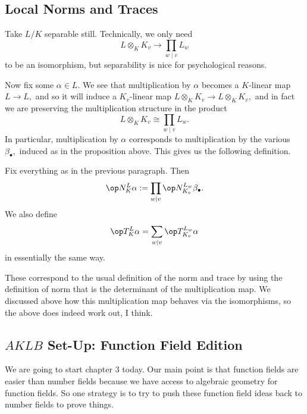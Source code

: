 \documentclass[../notes.tex]{subfiles}
\begin{document}
\subsection{Local Norms and Traces}
Take $L/K$ separable still. Technically, we only need
\[L\otimes_KK_v\to\prod_{w\mid v}L_w\]
to be an isomorphism, but separability is nice for psychological reasons.

Now fix some $\alpha\in L.$ We see that multiplication by $\alpha$ becomes a $K$-linear map $L\to L,$ and so it will induce a $K_v$-linear map $L\otimes_KK_v\to L\otimes_KK_v,$ and in fact we are preserving the multiplication structure in the product
\[L\otimes_KK_v\cong\prod_{w\mid v}L_w.\]
In particular, multiplication by $\alpha$ corresponds to multiplication by the various $\beta_\bullet,$ induced as in the proposition above. This gives us the following definition.
\begin{definition}
	Fix everything as in the previous paragraph. Then
	\[\op N_K^L\alpha:=\prod_{w\mid v}\op N_{K_v}^{L_w}\beta_\bullet.\]
	We also define
	\[\op T_K^L\alpha=\sum_{w\mid v}\op T_{K_v}^{L_w}\alpha\]
	in essentially the same way.
\end{definition}
These correspond to the usual definition of the norm and trace by using the definition of norm that is the determinant of the multiplication map. We discussed above how this multiplication map behaves via the isomorphisms, so the above does indeed work out, I think.

\subsection{\texorpdfstring{$AKLB$}{AKLB} Set-Up: Function Field Edition}
We are going to start chapter 3 today. Our main point is that function fields are easier than number fields because we have access to algebraic geometry for function fields. So one strategy is to try to push these function field ideas back to number fields to prove things.
\end{document}
